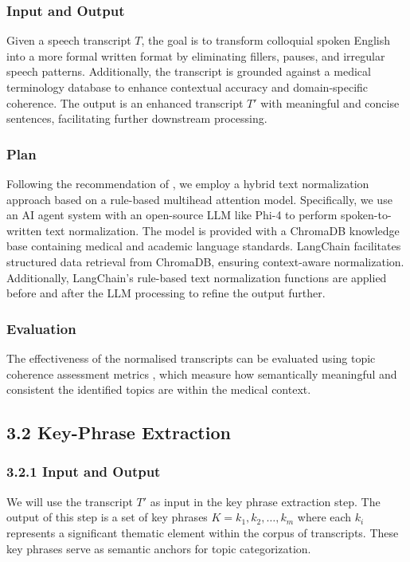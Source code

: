 \documentclass[11pt,a4paper]{article}
\begin{document}
\subsubsection{Input and Output}  
Given a speech transcript \( T \), the goal is to transform colloquial spoken English into a more formal written format by eliminating fillers, pauses, and irregular speech patterns. Additionally, the transcript is grounded against a medical terminology database to enhance contextual accuracy and domain-specific coherence. The output is an enhanced transcript \( T' \) with meaningful and concise sentences, facilitating further downstream processing.
\subsubsection{Plan}  
Following the recommendation of \cite{aliero2023systematic}, we employ a hybrid text normalization approach based on a rule-based multihead attention model. Specifically, we use an AI agent system with an open-source LLM like Phi-4 to perform spoken-to-written text normalization. The model is provided with a ChromaDB knowledge base containing medical and academic language standards. LangChain facilitates structured data retrieval from ChromaDB, ensuring context-aware normalization. Additionally, LangChain’s rule-based text normalization functions are applied before and after the LLM processing to refine the output further.
\subsubsection{Evaluation}  
The effectiveness of the normalised transcripts can be evaluated using topic coherence assessment metrics \cite{stammbach2023revisitingautomatedtopicmodel}, which measure how semantically meaningful and consistent the identified topics are within the medical context. 

\subsection*{3.2 Key-Phrase Extraction}
\subsubsection*{3.2.1 Input and Output}
We will use the transcript $T'$ as input in the key phrase extraction step. 
The output of this step is a set of key phrases $K = {k_1, k_2, \ldots, k_m}$ where each $k_i$ represents a significant thematic element within the corpus of transcripts. 
These key phrases serve as semantic anchors for topic categorization.
\end{document}
